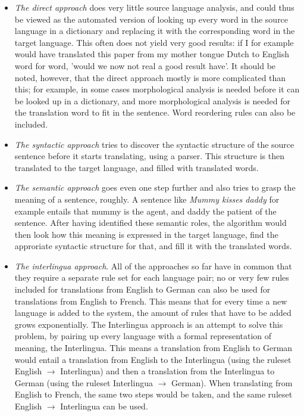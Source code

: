 \documentclass[12pt]{article}
\begin{document}
\begin{itemize}
\item \emph{The direct approach} does very little source language analysis, and could thus be viewed as the automated version of looking up every word in the source language in a dictionary and replacing it with the corresponding word in the target language. This often does not yield very good results: if I for example would have translated this paper from my mother tongue Dutch to English word for word, 'would we now not real a good result have'. It should be noted, however, that the direct approach mostly is more complicated than this; for example, in some cases morphological analysis is needed before it can be looked up in a dictionary, and more morphological analysis is needed for the translation word to fit in the sentence. Word reordering rules can also be included.
\item \emph{The syntactic approach} tries to discover the syntactic structure of the source sentence before it starts translating, using a parser. This structure is then translated to the target language, and filled with translated words.
\item \emph{The semantic approach} goes even one step further and also tries to grasp the meaning of a sentence, roughly. A sentence like \emph{Mummy kisses daddy} for example entails that mummy is the agent, and daddy the patient of the sentence. After having identified these semantic roles, the algorithm would then look how this meaning is expressed in the target language, find the approriate syntactic structure for that, and fill it with the translated words.
\item \emph{The interlingua approach}. All of the approaches so far have in common that they require a separate rule set for each language pair; no or very few rules included for translations from English to German can also be used for translations from English to French. This means that for every time a new language is added to the system, the amount of rules that have to be added grows exponentially. The Interlingua approach is an attempt to solve this problem, by pairing up every language with a formal representation of meaning, the Interlingua. This means a translation from English to German would entail a translation from English to the Interlingua (using the ruleset English $\rightarrow$ Interlingua) and then a translation from the Interlingua to German (using the ruleset Interlingua $\rightarrow$ German). When translating from English to French, the same two steps would be taken, and the same ruleset English $\rightarrow$ Interlingua can be used.
\end{itemize}
\end{document}

